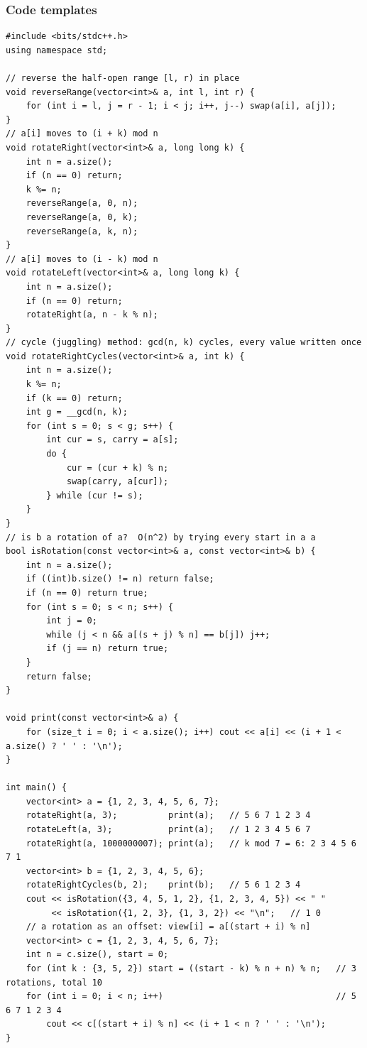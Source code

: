 \subsubsection*{Code templates}

\begin{lstlisting}[style=cpp]
#include <bits/stdc++.h>
using namespace std;

// reverse the half-open range [l, r) in place
void reverseRange(vector<int>& a, int l, int r) {
    for (int i = l, j = r - 1; i < j; i++, j--) swap(a[i], a[j]);
}
// a[i] moves to (i + k) mod n
void rotateRight(vector<int>& a, long long k) {
    int n = a.size();
    if (n == 0) return;
    k %= n;
    reverseRange(a, 0, n);
    reverseRange(a, 0, k);
    reverseRange(a, k, n);
}
// a[i] moves to (i - k) mod n
void rotateLeft(vector<int>& a, long long k) {
    int n = a.size();
    if (n == 0) return;
    rotateRight(a, n - k % n);
}
// cycle (juggling) method: gcd(n, k) cycles, every value written once
void rotateRightCycles(vector<int>& a, int k) {
    int n = a.size();
    k %= n;
    if (k == 0) return;
    int g = __gcd(n, k);
    for (int s = 0; s < g; s++) {
        int cur = s, carry = a[s];
        do {
            cur = (cur + k) % n;
            swap(carry, a[cur]);
        } while (cur != s);
    }
}
// is b a rotation of a?  O(n^2) by trying every start in a a
bool isRotation(const vector<int>& a, const vector<int>& b) {
    int n = a.size();
    if ((int)b.size() != n) return false;
    if (n == 0) return true;
    for (int s = 0; s < n; s++) {
        int j = 0;
        while (j < n && a[(s + j) % n] == b[j]) j++;
        if (j == n) return true;
    }
    return false;
}

void print(const vector<int>& a) {
    for (size_t i = 0; i < a.size(); i++) cout << a[i] << (i + 1 < a.size() ? ' ' : '\n');
}

int main() {
    vector<int> a = {1, 2, 3, 4, 5, 6, 7};
    rotateRight(a, 3);          print(a);   // 5 6 7 1 2 3 4
    rotateLeft(a, 3);           print(a);   // 1 2 3 4 5 6 7
    rotateRight(a, 1000000007); print(a);   // k mod 7 = 6: 2 3 4 5 6 7 1
    vector<int> b = {1, 2, 3, 4, 5, 6};
    rotateRightCycles(b, 2);    print(b);   // 5 6 1 2 3 4
    cout << isRotation({3, 4, 5, 1, 2}, {1, 2, 3, 4, 5}) << " "
         << isRotation({1, 2, 3}, {1, 3, 2}) << "\n";   // 1 0
    // a rotation as an offset: view[i] = a[(start + i) % n]
    vector<int> c = {1, 2, 3, 4, 5, 6, 7};
    int n = c.size(), start = 0;
    for (int k : {3, 5, 2}) start = ((start - k) % n + n) % n;   // 3 rotations, total 10
    for (int i = 0; i < n; i++)                                  // 5 6 7 1 2 3 4
        cout << c[(start + i) % n] << (i + 1 < n ? ' ' : '\n');
}
\end{lstlisting}


